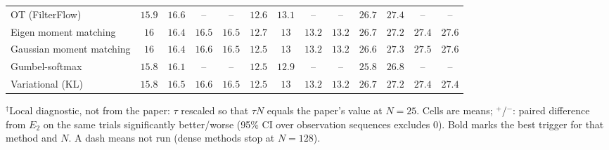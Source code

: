 \begin{table}[ht]
\begin{adjustbox}{max width=\linewidth}
\begin{tabular}{lcccc|cccc|cccc}
OT (FilterFlow) & $15.9$ & $16.6$ & -- & -- & $12.6$ & $13.1$ & -- & -- & $26.7$ & $27.4$ & -- & -- \\
Eigen moment matching & $16$ & $16.4$ & $16.5$ & $16.5$ & $12.7$ & $13$ & $13.2$ & $13.2$ & $26.7$ & $27.2$ & $27.4$ & $27.6$ \\
Gaussian moment matching & $16$ & $16.4$ & $16.6$ & $16.5$ & $12.5$ & $13$ & $13.2$ & $13.2$ & $26.6$ & $27.3$ & $27.5$ & $27.6$ \\
Gumbel-softmax & $15.8$ & $16.1$ & -- & -- & $12.5$ & $12.9$ & -- & -- & $25.8$ & $26.8$ & -- & -- \\
Variational (KL) & $15.8$ & $16.5$ & $16.6$ & $16.5$ & $12.5$ & $13$ & $13.2$ & $13.2$ & $26.7$ & $27.2$ & $27.4$ & $27.4$ \\
\bottomrule
\end{tabular}
\end{adjustbox}
\par\smallskip\parbox{0.95\linewidth}{\footnotesize $^\dagger$Local diagnostic, not from the paper: $\tau$ rescaled so that $\tau N$ equals the paper's value at $N{=}25$. Cells are means; $^{+}$/$^{-}$: paired difference from $E_2$ on the same trials significantly better/worse (95\% CI over observation sequences excludes 0). Bold marks the best trigger for that method and $N$. A dash means not run (dense methods stop at $N{=}128$).}
\end{table}

